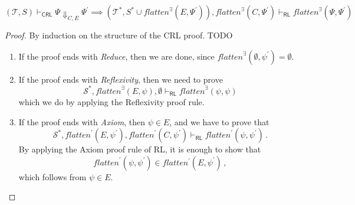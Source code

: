 \documentclass{article}
\newcommand{\RL}{\mathsf{RL}}
\newcommand{\CRL}{\mathsf{CRL}}
\begin{document}
\begin{lemma}
    \begin{equation*}
        (\mathcal{T}, S) \vdash_\CRL \Psi \Downarrow_{C,E} \Psi^\prime
        \implies
        (\mathcal{T}^*, S^* \cup \mathit{flatten}^\exists(E, \Psi^\prime)), \mathit{flatten}^\exists(C, \Psi^\prime) \vdash_\RL
          \mathit{flatten}^\exists(\Psi, \Psi^\prime) 
    \end{equation*}
\end{lemma}
\begin{proof}
By induction on the structure of the CRL proof. TODO
\begin{enumerate}
    \item If the proof ends with \emph{Reduce}, then we are done, since $\mathit{flatten}^\exists(\emptyset, \psi^\prime) = \emptyset$.
    
    \item If the proof ends with \emph{Reflexivity}, then we need to prove
    \begin{equation*}
        \mathcal{S}^*, \mathit{flatten}^\exists(E, \psi), \emptyset \vdash_\RL
          \mathit{flatten}^\exists(\psi, \psi) 
    \end{equation*}
    which we do by applying the Reflexivity proof rule.
    
    \item If the proof ends with \emph{Axiom}, then $\psi \in E$,
          and we have to prove that
          \begin{equation*}
            \mathcal{S}^*, \mathit{flatten}^\prime(E, \psi^\prime), \mathit{flatten}^\prime(C, \psi^\prime) \vdash_\RL
            \mathit{flatten}^\prime(\psi, \psi^\prime)               \, .
          \end{equation*}
          By applying the Axiom proof rule of RL, it is enough to show that
          \begin{equation*}
              \mathit{flatten}^\prime(\psi, \psi^\prime) \in \mathit{flatten^\prime}(E, \psi^\prime) \, ,
          \end{equation*}
          which follows from $\psi \in E$.
          

\end{enumerate}
\end{proof}
\end{document}
